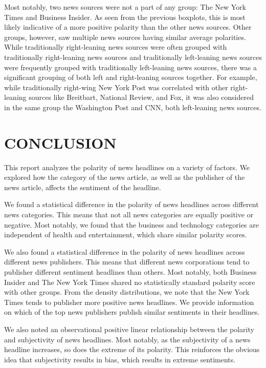 \documentclass[12pt]{article}
\begin{document}
Most notably, two news sources were not a part of any group: The New York Times and Business Insider. As seen from the previous boxplots, this is most likely indicative of a more positive polarity than the other news sources. Other groups, however, saw multiple news sources having similar average polarities. While traditionally right-leaning news sources were often grouped with traditionally right-leaning news sources and traditionally left-leaning news sources were frequently grouped with traditionally left-leaning news sources, there was a significant grouping of both left and right-leaning sources together. For example, while traditionally right-wing New York Post was correlated with other right-leaning sources like Breitbart, National Review, and Fox, it was also considered in the same group the Washington Post and CNN, both left-leaning news sources.

\section{CONCLUSION}

This report analyzes the polarity of news headlines on a variety of factors. We explored how the category of the news article, as well as the publisher of the news article, affects the sentiment of the headline.

We found a statistical difference in the polarity of news headlines across different news categories. This means that not all news categories are equally positive or negative. Most notably, we found that the business and technology categories are independent of health and entertainment, which share similar polarity scores. 

We also found a statistical difference in the polarity of news headlines across different news publishers. This means that different news corporations tend to publisher different sentiment headlines than others. Most notably, both Business Insider and The New York Times shared no statistically standard polarity score with other groups. From the density distributions, we note that the New York Times tends to publisher more positive news headlines. We provide information on which of the top news publishers publish similar sentiments in their headlines. 

We also noted an observational positive linear relationship between the polarity and subjectivity of news headlines. Most notably, as the subjectivity of a news headline increases, so does the extreme of its polarity. This reinforces the obvious idea that subjectivity results in bias, which results in extreme sentiments. 
\end{document}
